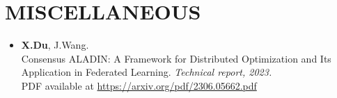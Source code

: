 \documentclass[paper=a4,fontsize=11pt]{scrartcl} %
\newcommand{\NewPart}[1]{\section*{\uppercase{#1}}}
\begin{document}
\NewPart{Miscellaneous}

\begin{itemize}
	\item {\textbf{X.Du}, J.Wang. \\
				{Consensus ALADIN: A Framework for Distributed Optimization and Its Application
						in Federated Learning.}
				\emph{Technical report, 2023.
				} \\
				PDF available at \url{https://arxiv.org/pdf/2306.05662.pdf}
			}
\end{itemize}
\end{document}
